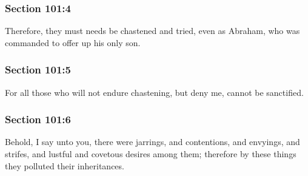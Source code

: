 	\subsubsection{Section 101:4} %
		\label{DC101-4}

		Therefore, they must needs be chastened and tried, even as Abraham, who was commanded to offer up his only son.


	\subsubsection{Section 101:5} %
		\label{DC101-5}

		For all those who will not endure chastening, but deny me, cannot be sanctified.


	\subsubsection{Section 101:6} %
		\label{DC101-6}

		Behold, I say unto you, there were jarrings, and contentions, and envyings, and strifes, and lustful and covetous desires among them; therefore by these things they polluted their inheritances.


